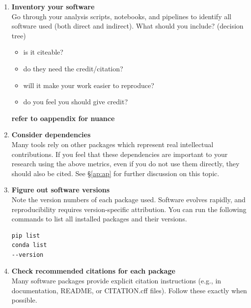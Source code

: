 \documentclass[twocolumn]{openjournal}
\begin{document}
\begin{enumerate}
    \item \textbf{Inventory your software} \\
    Go through your analysis scripts, notebooks, and pipelines to identify all software used (both direct and indirect). 
What should you include? (decision tree) 
\begin{itemize}
    \item is it citeable? %
    \item do they need the credit/citation? 
    \item will it make your work easier to reproduce? 
    \item do you feel you should give credit? 
\end{itemize}
\textbf{refer to oappendix for nuance}

\item \textbf{Consider dependencies} \\
    Many tools rely on other packages which represent real intellectual contributions. If you feel that these dependencies are important to your research using the above metrics, even if you do not use them directly, they should also be cited. See \S\ref{ap:ap} for further discussion on this topic.


  \item \textbf{Figure out software versions} \\
    Note the version numbers of each package used. Software evolves rapidly, and reproducibility requires version-specific attribution. You can run the following commands to list all installed packages and their versions. 

\begin{verbatim}
pip list
conda list
--version
\end{verbatim}

    \item \textbf{Check recommended citations for each package} \\
    Many software packages provide explicit citation instructions (e.g., in documentation, README, or CITATION.cff files). Follow these exactly when possible.



\end{enumerate}
\end{document}
